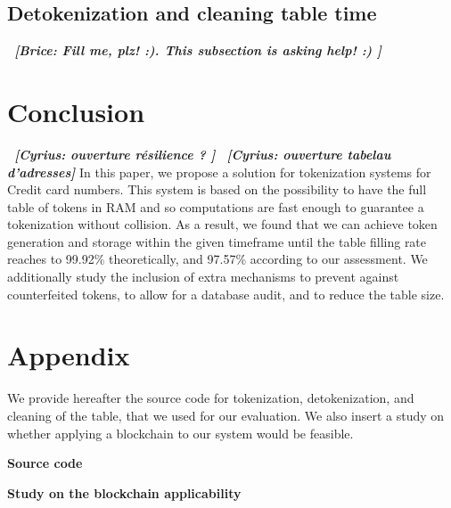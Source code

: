 \documentclass{llncs}
\newcommand{\cn}[1]{\emph{\bf \color{purple}~[Cyrius: #1]}}
\newcommand{\br}[1]{\emph{\bf \color{green}~[Brice: #1]}}
\begin{document}
\subsection{Detokenization and cleaning table time}
\br{Fill me, plz! :). This subsection is asking help! :) }

\section{Conclusion}\label{sect:conclu}

\cn{ouverture résilience ? }
\cn{ouverture tabelau d'adresses}
In this paper, we propose a solution for tokenization systems for Credit card numbers. This system is based on the possibility to have the full table of tokens in RAM and so computations are fast enough to guarantee a tokenization without collision. As a result, we found that we can achieve token generation and storage within the given timeframe until the table filling rate reaches to 99.92\% theoretically, and 97.57\% according to our assessment.
We additionally study the inclusion of extra mechanisms to prevent against counterfeited tokens, to allow for a database audit, and to reduce the table size.



\section*{Appendix}\label{appendix:code}

We provide hereafter the source code for tokenization, detokenization, and cleaning of the table, that we used for our evaluation. We also insert a study on whether applying a blockchain to our system would be feasible.

\textbf{Source code}


\textbf{Study on the blockchain applicability}
\end{document}
